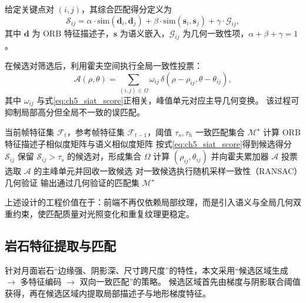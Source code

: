 \documentclass[UTF8,zihao=-4,a4paper,oneside,openany]{ctexrep}
\numberwithin{equation}{chapter}
\theoremstyle{plain}
\theoremstyle{definition}
\begin{document}
给定关键点对 $(i,j)$，其综合匹配得分定义为
\begin{equation}
\mathcal{S}_{ij}=\alpha \cdot \mathrm{sim}\!\left(\mathbf{d}_i,\mathbf{d}_j\right)
+\beta \cdot \mathrm{sim}\!\left(\mathbf{s}_i,\mathbf{s}_j\right)
+\gamma \cdot \mathcal{G}_{ij},
\label{eq:ch5_siat_score}
\end{equation}
其中 $\mathbf{d}$ 为 ORB 特征描述子，$\mathbf{s}$ 为语义嵌入，$\mathcal{G}_{ij}$ 为几何一致性项，$\alpha+\beta+\gamma=1$。

在候选对筛选后，利用霍夫空间执行全局一致性投票：
\begin{equation}
\mathcal{A}(\rho,\theta)=\sum_{(i,j)\in\Omega} \omega_{ij}\,
\delta\!\left(\rho-\rho_{ij},\theta-\theta_{ij}\right),
\label{eq:ch5_hough_vote}
\end{equation}
其中 $\omega_{ij}$ 与式\eqref{eq:ch5_siat_score}正相关，峰值单元对应主导几何变换。
该过程可抑制局部高分但全局不一致的误匹配。

\begin{algorithm}[H]
\caption{语义-霍夫协同匹配（SiaT-Hough）}
\label{alg:ch5_siat_hough}
\begin{algorithmic}[1]
\REQUIRE 当前帧特征集 $\mathcal{F}_t$，参考帧特征集 $\mathcal{F}_{t-1}$，阈值 $\tau_s,\tau_h$
\ENSURE 一致匹配集合 $\mathcal{M}^\star$
\STATE 计算 ORB 特征描述子相似度矩阵与语义相似度矩阵
\STATE 按式\eqref{eq:ch5_siat_score}得到候选得分 $\mathcal{S}_{ij}$
\STATE 保留 $\mathcal{S}_{ij}>\tau_s$ 的候选对，形成集合 $\Omega$
\STATE 计算 $(\rho_{ij},\theta_{ij})$ 并向霍夫累加器 $\mathcal{A}$ 投票
\ENDFOR
\STATE 选取 $\mathcal{A}$ 的主峰单元并回收一致候选
\STATE 对一致候选执行随机采样一致性（RANSAC）几何验证
\STATE 输出通过几何验证的匹配集 $\mathcal{M}^\star$
\end{algorithmic}
\end{algorithm}

上述设计的工程价值在于：前端不再仅依赖局部纹理，而是引入语义与全局几何双重约束，使匹配质量对光照变化和重复纹理更稳定。

\subsection{岩石特征提取与匹配}
\label{subsec:ch5_rock_feature_matching}

针对月面岩石“边缘强、阴影深、尺寸跨尺度”的特性，本文采用“候选区域生成 $\rightarrow$ 多特征编码 $\rightarrow$ 双向一致匹配”的策略。
候选区域首先由梯度与阴影联合阈值获得，再在候选区域内提取局部描述子与地形梯度特征。
\end{document}
